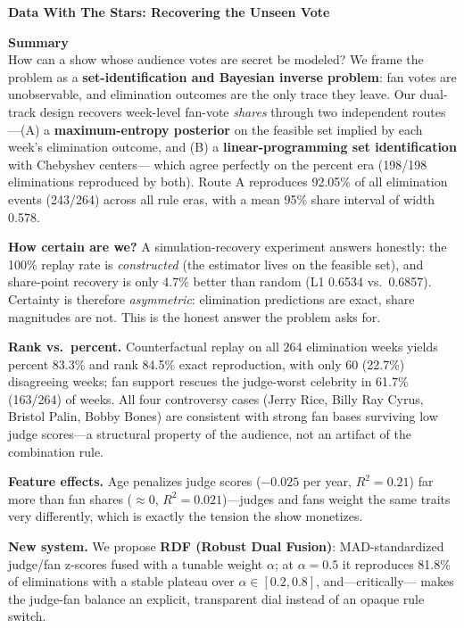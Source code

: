 \documentclass[12pt]{article}
\begin{document}
\begin{center}
{\LARGE\bfseries Data With The Stars: Recovering the Unseen Vote}\\[1.2em]
\end{center}

\textbf{Summary}\\
How can a show whose audience votes are secret be modeled? We frame the problem as a
\textbf{set-identification and Bayesian inverse problem}: fan votes are unobservable, and
elimination outcomes are the only trace they leave. Our dual-track design recovers
week-level fan-vote \emph{shares} through two independent routes---(A) a
\textbf{maximum-entropy posterior} on the feasible set implied by each week's elimination
outcome, and (B) a \textbf{linear-programming set identification} with Chebyshev centers---
which agree perfectly on the percent era (198/198 eliminations reproduced by both).
Route A reproduces 92.05\% of all elimination events (243/264) across all rule eras,
with a mean 95\% share interval of width 0.578.

\textbf{How certain are we?} A simulation-recovery experiment answers honestly: the
100\% replay rate is \emph{constructed} (the estimator lives on the feasible set), and
share-point recovery is only 4.7\% better than random (L1 0.6534 vs.\ 0.6857).
Certainty is therefore \emph{asymmetric}: elimination predictions are exact, share
magnitudes are not. This is the honest answer the problem asks for.

\textbf{Rank vs.\ percent.} Counterfactual replay on all 264 elimination weeks yields
percent 83.3\% and rank 84.5\% exact reproduction, with only 60 (22.7\%) disagreeing
weeks; fan support rescues the judge-worst celebrity in 61.7\% (163/264) of weeks.
All four controversy cases (Jerry Rice, Billy Ray Cyrus, Bristol Palin, Bobby Bones)
are consistent with strong fan bases surviving low judge scores---a structural property
of the audience, not an artifact of the combination rule.

\textbf{Feature effects.} Age penalizes judge scores ($-0.025$ per year, $R^2{=}0.21$)
far more than fan shares (${\approx}0$, $R^2{=}0.021$)---judges and fans weight the same
traits very differently, which is exactly the tension the show monetizes.

\textbf{New system.} We propose \textbf{RDF (Robust Dual Fusion)}: MAD-standardized
judge/fan z-scores fused with a tunable weight $\alpha$; at $\alpha{=}0.5$ it reproduces
81.8\% of eliminations with a stable plateau over $\alpha\in[0.2,0.8]$, and---critically---
makes the judge-fan balance an explicit, transparent dial instead of an opaque rule switch.
\end{document}
